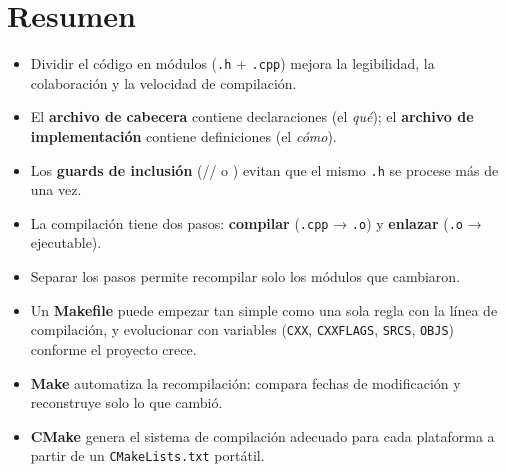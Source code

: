 \documentclass[12pt, oneside]{article}
\begin{document}
\section*{Resumen}

\begin{itemize}
  \item Dividir el código en módulos (\texttt{.h} + \texttt{.cpp}) mejora
        la legibilidad, la colaboración y la velocidad de compilación.
  \item El \textbf{archivo de cabecera} contiene declaraciones (el
        \textit{qué}); el \textbf{archivo de implementación} contiene
        definiciones (el \textit{cómo}).
  \item Los \textbf{guards de inclusión} (//
        o ) evitan que el mismo \texttt{.h} se procese
        más de una vez.
  \item La compilación tiene dos pasos: \textbf{compilar}
        (\texttt{.cpp} → \texttt{.o}) y \textbf{enlazar}
        (\texttt{.o} → ejecutable).
  \item Separar los pasos permite recompilar solo los módulos que cambiaron.
  \item Un \textbf{Makefile} puede empezar tan simple como una sola regla
        con la línea de compilación, y evolucionar con variables
        (\texttt{CXX}, \texttt{CXXFLAGS}, \texttt{SRCS}, \texttt{OBJS})
        conforme el proyecto crece.
  \item \textbf{Make} automatiza la recompilación: compara fechas de
        modificación y reconstruye solo lo que cambió.
  \item \textbf{CMake} genera el sistema de compilación adecuado para cada
        plataforma a partir de un \texttt{CMakeLists.txt} portátil.
\end{itemize}
\end{document}
